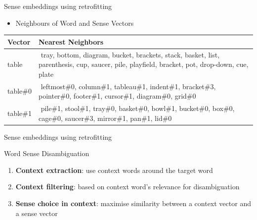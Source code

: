 \begin{frame}{Sense embeddings using retrofitting}

\begin{itemize}
	\item Neighbours of Word and Sense Vectors
\end{itemize}


%

\begin{tabular}{l|p{9cm}}
\bf Vector & \bf {Nearest Neighbors} \\ \toprule
 table & $ $ \alert{tray}, \textcolor{Cerulean}{bottom}, \textcolor{Cerulean}{diagram}, \alert{bucket}, \textcolor{Cerulean}{brackets}, \textcolor{Cerulean}{stack}, \alert{basket}, \textcolor{Cerulean}{list}, \textcolor{Cerulean}{parenthesis}, \alert{cup}, \alert{saucer}, \alert{pile}, \alert{playfield}, \textcolor{Cerulean}{bracket}, \alert{pot}, \textcolor{Cerulean}{drop-down}, \alert{cue}, \alert{plate} \\ \midrule
 \pause
  \textcolor{Cerulean}{table\#0} & $ $ \textcolor{Cerulean}{leftmost\#0},  \textcolor{Cerulean}{column\#1},  \textcolor{Cerulean}{tableau\#1},  \textcolor{Cerulean}{indent\#1},  \textcolor{Cerulean}{bracket\#3},  \textcolor{Cerulean}{pointer\#0},  \textcolor{Cerulean}{footer\#1}, \textcolor{Cerulean}{cursor\#1}, \textcolor{Cerulean}{diagram\#0}, \textcolor{Cerulean}{grid\#0} \\ \midrule
   \alert{table\#1} & $ $ \alert{pile\#1,  stool\#1,  tray\#0,  basket\#0,  bowl\#1,  bucket\#0,  box\#0,  cage\#0,  saucer\#3,      mirror\#1,  pan\#1,  lid\#0}  \\ 
\end{tabular}
	

\end{frame}




\begin{frame}{Sense embeddings using retrofitting}
	
	\begin{block}{Word Sense Disambiguation}
	
	\begin{enumerate} 
	\item \textbf{\alert{Context extraction}}: use context words around the target word
	\item \textbf{\alert{Context filtering}}: based on context word's relevance for disambiguation
	
	\item \textbf{\alert{Sense choice in context}}: maximise similarity between a context vector and a sense vector
	
	\end{enumerate}
	\end{block}

\end{frame}


